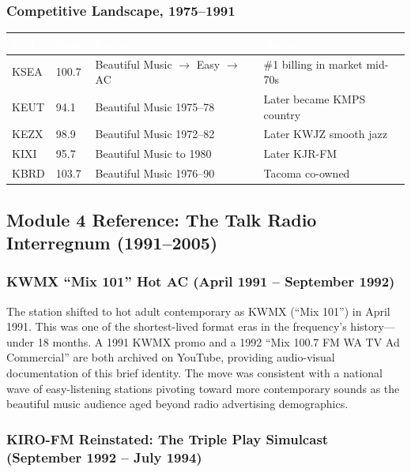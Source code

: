 \documentclass[11pt,letterpaper]{article}
\newcommand{\tableheader}[1]{\textbf{\sffamily\textcolor{white}{#1}}}
\begin{document}
\subsubsection{Competitive Landscape, 1975--1991}

\begin{center}
\begin{tabularx}{\textwidth}{L{2cm}L{2cm}L{3.5cm}X}
\toprule
{}
\tableheader{Call} & \tableheader{Freq.} & \tableheader{Format} & \tableheader{Notes} \\
\midrule
KSEA & 100.7 & Beautiful Music $\rightarrow$ Easy $\rightarrow$ AC & \#1 billing in market mid-70s \\
KEUT & 94.1 & Beautiful Music 1975--78 & Later became KMPS country \\
KEZX & 98.9 & Beautiful Music 1972--82 & Later KWJZ smooth jazz \\
KIXI & 95.7 & Beautiful Music to 1980 & Later KJR-FM \\
KBRD & 103.7 & Beautiful Music 1976--90 & Tacoma co-owned \\
\bottomrule
\end{tabularx}
\end{center}

\subsection{Module 4 Reference: The Talk Radio Interregnum (1991--2005)}

\subsubsection{KWMX ``Mix 101'' Hot AC (April 1991 -- September 1992)}

The station shifted to hot adult contemporary as KWMX (``Mix 101'') in April 1991. This was one of the shortest-lived format eras in the frequency's history---under 18 months. A 1991 KWMX promo and a 1992 ``Mix 100.7 FM WA TV Ad Commercial'' are both archived on YouTube, providing audio-visual documentation of this brief identity. The move was consistent with a national wave of easy-listening stations pivoting toward more contemporary sounds as the beautiful music audience aged beyond radio advertising demographics.

\subsubsection{KIRO-FM Reinstated: The Triple Play Simulcast (September 1992 -- July 1994)}
\end{document}
